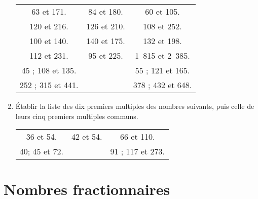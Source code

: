 \documentclass[12 pt]{extarticle}
\theoremstyle{plain}
\begin{document}
\begin{enumerate}
\begin{center}\begin{tabular}{ccc}
63 et 171. & 84 et 180. & 60 et 105.\\
120 et 216. & 126 et 210. & 108 et 252. \\ 
100 et 140. & 140 et 175. & 132 et 198. \\
112 et 231. & 95 et 225. & 1~815 et 2~385. \\
45 ; 108 et 135. &  & 55 ; 121 et 165.\\
252 ; 315 et 441. & & 378 ; 432 et 648. 
\end{tabular} \end{center}

\item Établir la liste des dix premiers multiples des
nombres suivants, puis celle de leurs cinq premiers
multiples communs. 
\begin{center}\begin{tabular}{ccc} 
36 et 54. & 42 et 54. & 66 et 110. \\
40; 45 et 72. & & 91 ; 117 et 273.\end{tabular}
\end{center}
\end{enumerate}
\section{Nombres fractionnaires}
\end{document}
